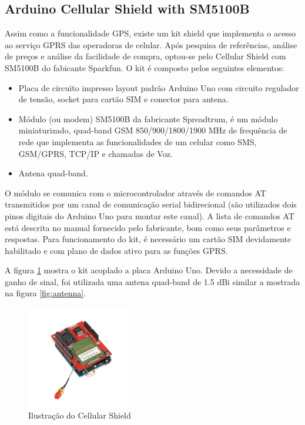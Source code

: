 \subsection {Arduino Cellular Shield with SM5100B}

Assim como a funcionalidade GPS, existe um kit shield que implementa o acesso ao serviço GPRS das operadoras de celular. Após pesquisa de referências, análise de preços e análise da facilidade de compra, optou-se pelo Cellular Shield com SM5100B do fabicante Sparkfun. O kit é composto pelos seguintes elementos:

\begin{itemize}
	\item Placa de circuito impresso layout padrão Arduino Uno com circuito regulador de tensão, socket para cartão SIM e conector para antena.
	\item Módulo (ou modem) SM5100B da fabricante Spreadtrum, é um módulo miniaturizado, quad-band GSM 850/900/1800/1900 MHz de frequência de rede que implementa as funcionalidades de um celular como SMS, GSM/GPRS, TCP/IP e chamadas de Voz.
	\item Antena quad-band.
\end{itemize}

O módulo se comunica com o microcontrolador através de comandos AT transmitidos por um canal de comunicação serial bidirecional (são utilizados dois pinos digitais do Arduino Uno para montar este canal). A lista de comandos AT está descrita no manual fornecido pelo fabricante, bom como seus parâmetros e respostas. Para funcionamento do kit, é necessário um cartão SIM devidamente habilitado e com plano de dados ativo para as funções GPRS.

 A figura \ref{fig:cellularshield} mostra o kit acoplado a placa Arduino Uno. Devido a necessidade de ganho de sinal, foi utilizada uma antena quad-band de 1.5 dBi similar a mostrada na figura \ref{fig:antenna}.

\begin{figure}[h!]
			\centering
			\includegraphics[width=0.4\textwidth]{figures/gsm.jpg}
			\caption{Ilustra\c{c}\~{a}o do Cellular Shield}
			\label{fig:cellularshield}
\end{figure}

